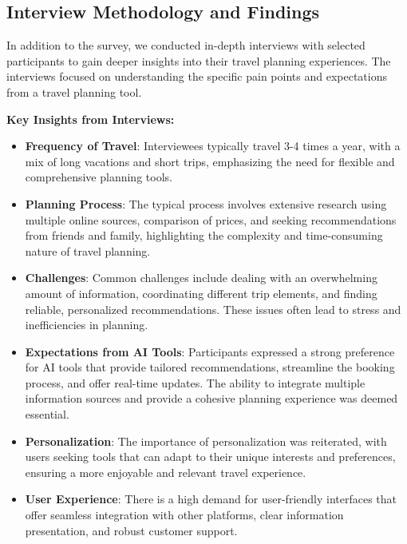 \documentclass[conference]{IEEEtran}
\begin{document}
    \subsection{Interview Methodology and Findings}
        In addition to the survey, we conducted in-depth interviews with selected participants to gain deeper insights into their travel planning experiences. The interviews focused on understanding the specific pain points and expectations from a travel planning tool.
        
        \textbf{Key Insights from Interviews:}
        
        \begin{itemize}
            \item \textbf{Frequency of Travel}: Interviewees typically travel 3-4 times a year, with a mix of long vacations and short trips, emphasizing the need for flexible and comprehensive planning tools.
            \item \textbf{Planning Process}: The typical process involves extensive research using multiple online sources, comparison of prices, and seeking recommendations from friends and family, highlighting the complexity and time-consuming nature of travel planning.
            \item \textbf{Challenges}: Common challenges include dealing with an overwhelming amount of information, coordinating different trip elements, and finding reliable, personalized recommendations. These issues often lead to stress and inefficiencies in planning.
            \item \textbf{Expectations from AI Tools}: Participants expressed a strong preference for AI tools that provide tailored recommendations, streamline the booking process, and offer real-time updates. The ability to integrate multiple information sources and provide a cohesive planning experience was deemed essential.
            \item \textbf{Personalization}: The importance of personalization was reiterated, with users seeking tools that can adapt to their unique interests and preferences, ensuring a more enjoyable and relevant travel experience.
            \item \textbf{User Experience}: There is a high demand for user-friendly interfaces that offer seamless integration with other platforms, clear information presentation, and robust customer support.
        \end{itemize}
        
\end{document}
